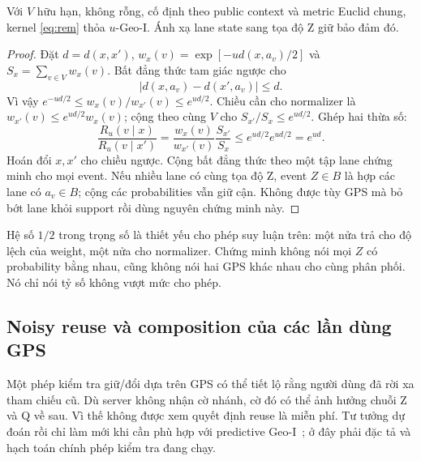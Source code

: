 \begin{proposition}\label{prop:rem}
Với $V$ hữu hạn, không rỗng, cố định theo public context và metric Euclid chung, kernel
\eqref{eq:rem} thỏa $u$-Geo-I. Ánh xạ lane state sang tọa độ Z giữ bảo đảm đó.
\end{proposition}
\begin{proof}
Đặt $d=d(x,x')$, $w_x(v)=\exp[-u d(x,a_v)/2]$ và $S_x=\sum_{v\in V}w_x(v)$.
Bất đẳng thức tam giác ngược cho
\[
|d(x,a_v)-d(x',a_v)|\le d.
\]
Vì vậy $e^{-ud/2}\le w_x(v)/w_{x'}(v)\le e^{ud/2}$. Chiều cần cho normalizer là
$w_{x'}(v)\le e^{ud/2}w_x(v)$; cộng theo cùng $V$ cho $S_{x'}/S_x\le e^{ud/2}$.
Ghép hai thừa số:
\begin{equation}
\frac{R_u(v\mid x)}{R_u(v\mid x')}
=\frac{w_x(v)}{w_{x'}(v)}\frac{S_{x'}}{S_x}\le e^{ud/2}e^{ud/2}=e^{ud}.
\label{eq:rem-ratio}
\end{equation}
Hoán đổi $x,x'$ cho chiều ngược. Cộng bất đẳng thức theo một tập lane chứng minh cho mọi event.
Nếu nhiều lane có cùng tọa độ Z, event $Z\in B$ là hợp các lane có $a_v\in B$; cộng các probabilities
vẫn giữ cận. Không được tùy GPS mà bỏ bớt lane khỏi support rồi dùng nguyên chứng minh này.
\end{proof}

Hệ số $1/2$ trong trọng số là thiết yếu cho phép suy luận trên: một nửa trả cho độ lệch của weight,
một nửa cho normalizer. Chứng minh không nói mọi $Z$ có probability bằng nhau, cũng không nói
hai GPS khác nhau cho cùng phân phối. Nó chỉ nói tỷ số không vượt mức cho phép.

\subsection{Noisy reuse và composition của các lần dùng GPS}
Một phép kiểm tra giữ/đổi dựa trên GPS có thể tiết lộ rằng người dùng đã rời xa tham chiếu cũ. Dù
server không nhận cờ nhánh, cờ đó có thể ảnh hưởng chuỗi Z và Q về sau. Vì thế không được xem quyết
định reuse là miễn phí. Tư tưởng dự đoán rồi chỉ làm mới khi cần phù hợp với predictive
Geo-I~\cite{predictive}; ở đây phải đặc tả và hạch toán chính phép kiểm tra đang chạy.

